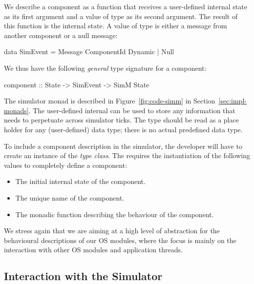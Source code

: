 We describe a component as a function that receives a user-defined internal state as its first argument and a value of type  as its second argument.
The result of this function is the internal state.
A value of type  is either a message from another component or a null message:
\begin{code}
data SimEvent
  =  Message ComponentId Dynamic
  |  Null
\end{code}
We thus have the following \emph{general} type signature for a component:
\begin{code}
component :: State -> SimEvent -> SimM State
\end{code}

The simulator monad  is described in Figure~\ref{fig:code-simm} in Section~\ref{sec:impl-monads}.
The user-defined internal  can be used to store any information that needs to perpetuate across simulator ticks.
The type  should be read as a place holder for any (user-defined) data type; there is no actual predefined  data type.

To include a component description in the simulator, the developer will have to create an instance of the  \emph{type class}.
The  requires the instantiation of the following values to completely define a component:

\begin{itemize}
  \item The initial internal state of the component.
  \item The unique name of the component.
  \item The monadic function describing the behaviour of the component.
\end{itemize}

We stress again that we are aiming at a high level of abstraction for the behavioural descriptions of our OS modules, where the focus is mainly on the interaction with other OS modules and application threads.


\subsection{Interaction with the Simulator}

